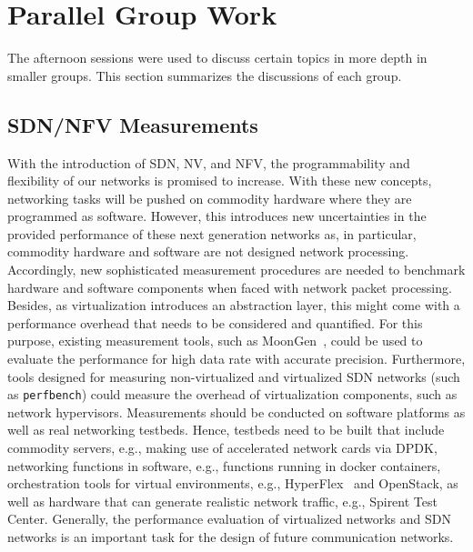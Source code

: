 \section{Parallel Group Work}\label{sec:parallel-group-work}

The afternoon sessions were used to discuss certain topics in more depth in
smaller groups. This section summarizes the discussions of each group.

\subsection{SDN/NFV Measurements}

With the introduction of \ac{SDN}, \ac{NV}, and \ac{NFV}, the programmability
and flexibility of our networks is promised to increase. With these new
concepts, networking tasks will be pushed on commodity hardware where they are
programmed as software.  However, this introduces new uncertainties in the
provided performance of these next generation networks as, in particular,
commodity hardware and software are not designed network processing.
Accordingly, new sophisticated measurement procedures are needed to benchmark
hardware and software components when faced with network packet processing.
Besides, as virtualization introduces an abstraction layer, this might come
with a performance overhead that needs to be considered and quantified. For
this purpose, existing measurement tools, such as MoonGen~\cite{pemmerich:imc:2015}, could be used to evaluate the performance for high
data rate with accurate precision.  Furthermore, tools designed for measuring
non-virtualized and virtualized \ac{SDN} networks (such as \texttt{perfbench}) could
measure the overhead of virtualization components, such as network
hypervisors. Measurements should be conducted on software platforms as well as
real networking testbeds. Hence, testbeds need to be built that include
commodity servers, e.g., making use of accelerated network cards via
\ac{DPDK}, networking functions in software, e.g., functions running in docker
containers, orchestration tools for virtual environments, e.g., HyperFlex~\cite{ablenk:im:2015} and OpenStack, as well as hardware that can generate
realistic network traffic, e.g., Spirent Test Center.  Generally, the
performance evaluation of virtualized networks and SDN networks is an
important task for the design of future communication networks.


